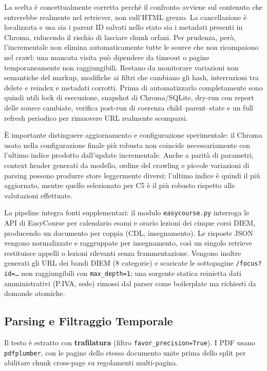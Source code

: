 \documentclass[11pt,a4paper]{article}
\newcommand{\code}[1]{\texttt{\small#1}}
\begin{document}
La scelta è concettualmente corretta perché il confronto avviene sul contenuto che entrerebbe
realmente nel retriever, non sull'HTML grezzo. La cancellazione è localizzata e usa sia i
parent ID salvati nello stato sia i metadati presenti in Chroma, riducendo il rischio di
lasciare chunk orfani. Per prudenza, però, l'incrementale non elimina automaticamente tutte
le source che non ricompaiono nel crawl: una mancata visita può dipendere da timeout o pagine
temporaneamente non raggiungibili. Restano da monitorare variazioni non semantiche del
markup, modifiche ai filtri che cambiano gli hash, interruzioni tra delete e reindex e
metadati corrotti. Prima di automatizzarlo completamente sono quindi utili lock di
esecuzione, snapshot di Chroma/SQLite, dry-run con report delle source cambiate, verifica
post-run di coerenza child--parent--state e un full refresh periodico per rimuovere URL
realmente scomparsi.

È importante distinguere aggiornamento e configurazione sperimentale: il Chroma usato nella
configurazione finale più robusta non coincide necessariamente con l'ultimo indice prodotto
dall'update incrementale. Anche a parità di parametri, context header generati da modello,
ordine del crawling e piccole variazioni di parsing possono produrre store leggermente
diversi; l'ultimo indice è quindi il più aggiornato, mentre quello selezionato per C5 è il
più robusto rispetto alle valutazioni effettuate.

La pipeline integra fonti supplementari: il modulo \code{easycourse.py} interroga le API
di EasyCourse per calendario esami e orario lezioni dei cinque corsi DIEM, producendo un
documento per coppia (CDL, insegnamento). Le risposte JSON vengono normalizzate e
raggruppate per insegnamento, così un singolo retrieve restituisce appelli o lezioni
rilevanti senza frammentazione. Vengono inoltre generati gli URL dei bandi DIEM (8 categorie) e scaricate le sottopagine
\texttt{/focus?id=\ldots} non raggiungibili con \code{max\_depth=1}; una sorgente statica
reinietta dati amministrativi (P.IVA, sede) rimossi dal parser come boilerplate ma
richiesti da domande atomiche.

\subsection{Parsing e Filtraggio Temporale}
\label{sec:parser}

Il testo è estratto con \textbf{trafilatura} \citep{barbaresi2021trafilatura} (filtro
\code{favor\_precision=True}). I PDF usano
\texttt{pdfplumber}, con le pagine dello stesso documento unite prima dello split per
abilitare chunk cross-page su regolamenti multi-pagina.
\end{document}
